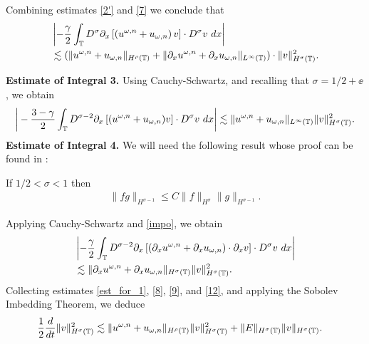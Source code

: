 %
%
Combining estimates \eqref{2'} and \eqref{7} we conclude that
%
%
\begin{equation}
\begin{split}
& \left | -\frac{\gamma}{2} \int_{\mathbb{T}} D^\sigma \partial_x \left[ \left( 
u^{\omega,n} + u_{\omega,n}
\right)v \right]  \cdot D^\sigma v \ dx \right |
\\
& \lesssim (\|u^{\omega,n} + u_{\omega,n}\|_{H^{\rho}(\mathbb{T})} + \|\partial_x 
u^{\omega,n} +
\partial_x u_{\omega,n}\|_{L^\infty(\mathbb{T})} ) \cdot \|v\|_{H^\sigma(\mathbb{T})}^2.
\label{8}
\end{split}
\end{equation}
%
%
%

\textbf{Estimate of Integral 3.} Using Cauchy-Schwartz, and recalling that
$\sigma = 1/2 + \ee$,  we obtain
%
%
\begin{equation}
\begin{split}
\bigg | -\frac{3-\gamma}{2} \int_{\mathbb{T}} D^{\sigma -2} \partial_x \left[
(u^{\omega,n} + u_{\omega,n})v \right]
\cdot D^\sigma v \ dx \bigg |
 \lesssim \|u^{\omega,n} + u_{\omega,n} \|_{L^\infty(\mathbb{T})} 
\|v\|_{H^\sigma(\mathbb{T})}^2.
\label{9}
\end{split}
\end{equation}
%
%
%
\textbf{Estimate of Integral 4.}
We will need the following result whose proof can be found in 
\cite{Himonas_2009_Non-uniform-dep-per}:
%
%
%
\begin{lemma}
\label{impo}
If  $1/2 < \sigma < 1 $ then
%
%
\begin{equation}
\begin{split}
\|fg\|_{H^{\sigma - 1}} \le C \|f\|_{H^{\sigma}}
\|g\|_{H^{\sigma -1}}.
\label{11}
\end{split}
\end{equation}
%
%
\end{lemma}
%
Applying Cauchy-Schwartz and  \cref{impo}, we obtain
%
%
\begin{equation}
\begin{split}
& \left | -\frac{\gamma}{2} \int_{\mathbb{T}} D^{\sigma -2 } \partial_x \left[
\left( \partial_x u^{\omega,n} + \partial_x u_{\omega,n} \right) \cdot \partial_x v
\right] \cdot D^\sigma v \ dx \right |
\\
& \lesssim \|\partial_x u^{\omega,n} + \partial_x u_{\omega,n}
\|_{H^\sigma(\mathbb{T})} \|v\|_{H^\sigma(\mathbb{T})}^2.
\label{12}
\end{split}
\end{equation}
%
%
Collecting estimates \eqref{est_for_1}, \eqref{8}, \eqref{9}, and
\eqref{12}, and applying the Sobolev Imbedding Theorem, we deduce
%
%
\begin{equation}
\begin{split}
\frac{1}{2}\frac{d}{dt} \|v\|_{H^\sigma(\mathbb{T})}^2
& \lesssim
\|u^{\omega,n} + u_{\omega,n}\|_{H^{\rho}(\mathbb{T})} \|v\|_{H^\sigma(\mathbb{T})}^2
+ \|E\|_{H^\sigma(\mathbb{T})}
\|v\|_{H^\sigma(\mathbb{T})}.
\label{10}
\end{split}
\end{equation}
